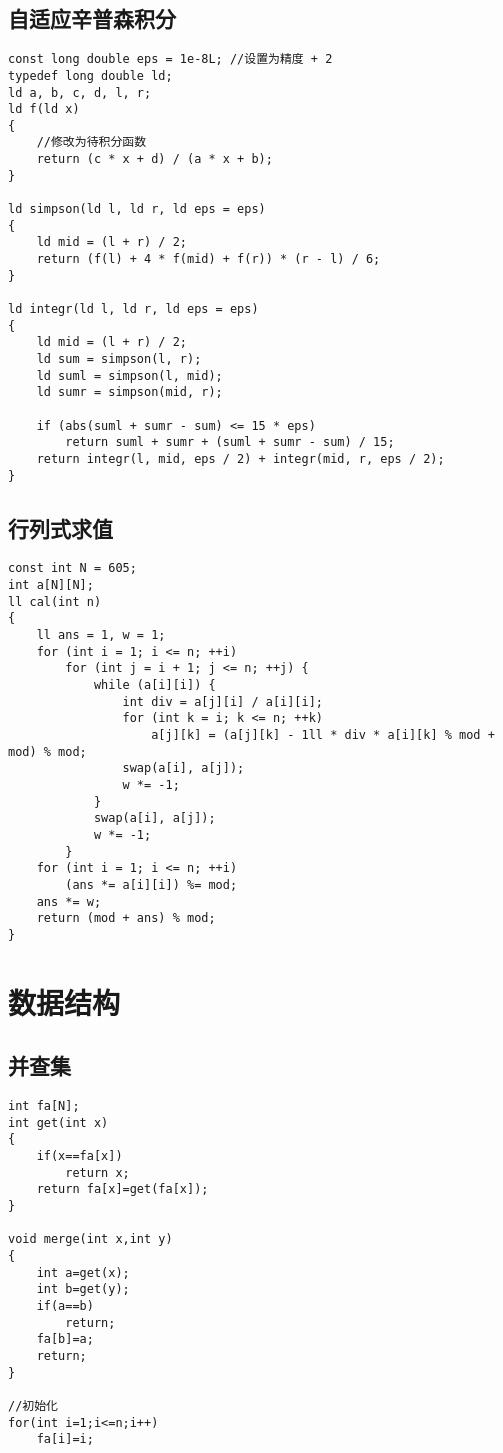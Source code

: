 \documentclass[twocolumn,a4]{article}
\begin{document}
\subsection{自适应辛普森积分}
\begin{lstlisting}
const long double eps = 1e-8L; //设置为精度 + 2
typedef long double ld;
ld a, b, c, d, l, r;
ld f(ld x)
{
    //修改为待积分函数
    return (c * x + d) / (a * x + b);
}

ld simpson(ld l, ld r, ld eps = eps)
{
    ld mid = (l + r) / 2;
    return (f(l) + 4 * f(mid) + f(r)) * (r - l) / 6;
}

ld integr(ld l, ld r, ld eps = eps)
{
    ld mid = (l + r) / 2;
    ld sum = simpson(l, r);
    ld suml = simpson(l, mid);
    ld sumr = simpson(mid, r);

    if (abs(suml + sumr - sum) <= 15 * eps)
        return suml + sumr + (suml + sumr - sum) / 15;
    return integr(l, mid, eps / 2) + integr(mid, r, eps / 2);
}
\end{lstlisting}

\subsection{行列式求值}
\begin{lstlisting}
const int N = 605;
int a[N][N];
ll cal(int n)
{
    ll ans = 1, w = 1;
    for (int i = 1; i <= n; ++i)
        for (int j = i + 1; j <= n; ++j) {
            while (a[i][i]) {
                int div = a[j][i] / a[i][i];
                for (int k = i; k <= n; ++k)
                    a[j][k] = (a[j][k] - 1ll * div * a[i][k] % mod + mod) % mod;
                swap(a[i], a[j]);
                w *= -1;
            }
            swap(a[i], a[j]);
            w *= -1;
        }
    for (int i = 1; i <= n; ++i)
        (ans *= a[i][i]) %= mod;
    ans *= w;
    return (mod + ans) % mod;
}
\end{lstlisting}
\section{数据结构}

\subsection{并查集}
\begin{lstlisting}
int fa[N];
int get(int x)
{
    if(x==fa[x])
        return x;
    return fa[x]=get(fa[x]);
}

void merge(int x,int y)
{
    int a=get(x);
    int b=get(y);
    if(a==b)
        return;
    fa[b]=a;
    return;
}

//初始化
for(int i=1;i<=n;i++)
    fa[i]=i;
\end{lstlisting}
\end{document}
